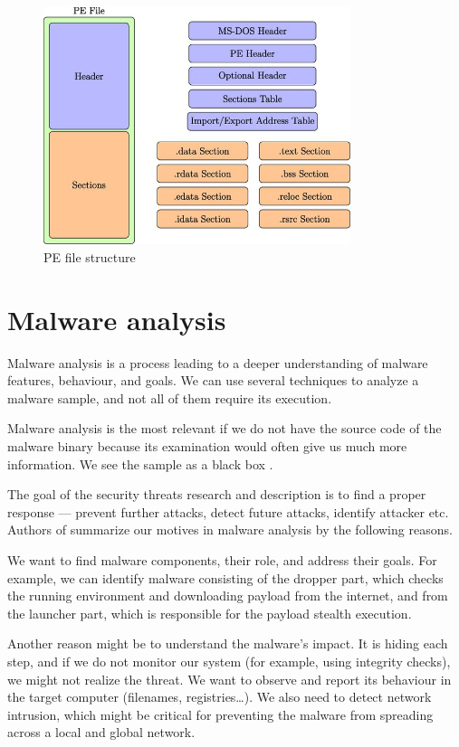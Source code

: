 \begin{figure}[h]
  \centering
  \includegraphics[width=0.8\textwidth]{figures/pe.jpg}
  \caption{PE file structure \cite{Gibert2020}}
  \label{fig:pe}
\end{figure}

\section{Malware analysis}
Malware analysis is a process leading to a deeper understanding of malware features, behaviour, and goals. We can use several techniques to analyze a malware sample, and not all of them require its execution.

Malware analysis is the most relevant if we do not have the source code of the malware binary because its examination would often give us much more information. We see the sample as a black box \cite{Sikorski2012}.

The goal of the security threats research and description is to find a proper response --- prevent further attacks, detect future attacks, identify attacker etc. Authors of \cite{KA2018} summarize our motives in malware analysis by the following reasons. 

We want to find malware components, their role, and address their goals. For example, we can identify malware consisting of the dropper part, which checks the running environment and downloading payload from the internet, and from the launcher part, which is responsible for the payload stealth execution. 

Another reason might be to understand the malware's impact. It is hiding each step, and if we do not monitor our system (for example, using integrity checks), we might not realize the threat. We want to observe and report its behaviour in the target computer (filenames, registries\dots). We also need to detect network intrusion, which might be critical for preventing the malware from spreading across a local and global network. 

